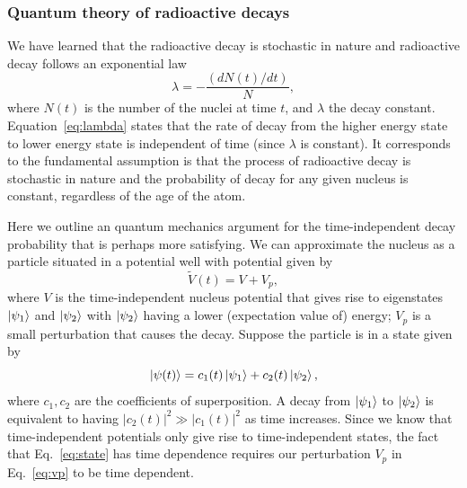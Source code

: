 \documentclass[nofootinbib,preprint,aps]{revtex4-1}
\begin{document}
        \subsubsection{Quantum theory of radioactive decays}
        We have learned that the radioactive decay is stochastic in nature and radioactive decay follows
        an exponential law
        \begin{equation}
            \label{eq:lambda}
            \lambda = -\frac{(dN(t)/dt)}{N},
        \end{equation}
        where $N(t)$ is the number of the nuclei at time $t$, and $\lambda$ the decay constant.
        Equation~\ref{eq:lambda} states that the rate of decay from the higher energy state to
        lower energy state is independent of time (since $\lambda$ is constant).
        It corresponds to the fundamental assumption is that the process of radioactive decay is stochastic
        in nature and the probability of decay for any given nucleus is constant,
        regardless of the age of the atom. 
        
        Here we outline an quantum mechanics argument for the time-independent decay probability that is perhaps more
        satisfying.
        We can approximate the nucleus as a particle situated in a potential well with potential given by
        \begin{equation}
            \label{eq:vp}
            \tilde{V}(t) = V + V_p,
        \end{equation}
        where $V$ is the time-independent nucleus potential that gives rise to eigenstates $\ket{\psi_1}$
        and $\ket{\psi_2}$ with $\ket{\psi_2}$ having a lower (expectation value of) energy; $V_p$ is a small
        perturbation that causes the decay.
        Suppose the particle is in a state given by
        \begin{equation}
            \label{eq:state}
            \ket{\psi(t)} = c_1(t)\ket{\psi_1} + c_2(t)\ket{\psi_2},
        \end{equation}
        where $c_1,c_2$ are the coefficients of superposition.
        A decay from $\ket{\psi_1}$ to $\ket{\psi_2}$ is equivalent to
        having $|c_2(t)|^2\gg |c_1(t)|^2$ as time increases. Since we know that time-independent potentials
        only give rise to time-independent states, the fact that Eq.~\ref{eq:state} has time dependence requires
        our perturbation $V_p$ in Eq.~\ref{eq:vp} to be time dependent.
        
\end{document}
